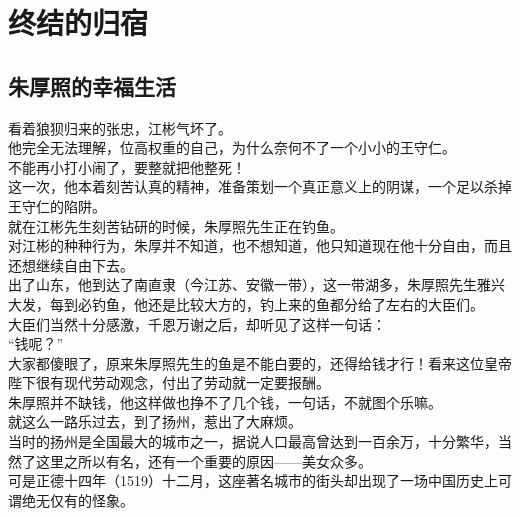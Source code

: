 \section{终结的归宿}
\ifnum{}
	\begin{multicols}{\theparacolNo}
\fi
\subsection{朱厚照的幸福生活}
看着狼狈归来的张忠，江彬气坏了。\\

他完全无法理解，位高权重的自己，为什么奈何不了一个小小的王守仁。\\

不能再小打小闹了，要整就把他整死！\\

这一次，他本着刻苦认真的精神，准备策划一个真正意义上的阴谋，一个足以杀掉王守仁的陷阱。\\

就在江彬先生刻苦钻研的时候，朱厚照先生正在钓鱼。\\

对江彬的种种行为，朱厚并不知道，也不想知道，他只知道现在他十分自由，而且还想继续自由下去。\\

出了山东，他到达了南直隶（今江苏、安徽一带），这一带湖多，朱厚照先生雅兴大发，每到必钓鱼，他还是比较大方的，钓上来的鱼都分给了左右的大臣们。\\

大臣们当然十分感激，千恩万谢之后，却听见了这样一句话：\\

“钱呢？”\\

大家都傻眼了，原来朱厚照先生的鱼是不能白要的，还得给钱才行！看来这位皇帝陛下很有现代劳动观念，付出了劳动就一定要报酬。\\

朱厚照并不缺钱，他这样做也挣不了几个钱，一句话，不就图个乐嘛。\\

就这么一路乐过去，到了扬州，惹出了大麻烦。\\

当时的扬州是全国最大的城市之一，据说人口最高曾达到一百余万，十分繁华，当然了这里之所以有名，还有一个重要的原因——美女众多。\\

可是正德十四年（1519）十二月，这座著名城市的街头却出现了一场中国历史上可谓绝无仅有的怪象。\\


\end{multicols}
